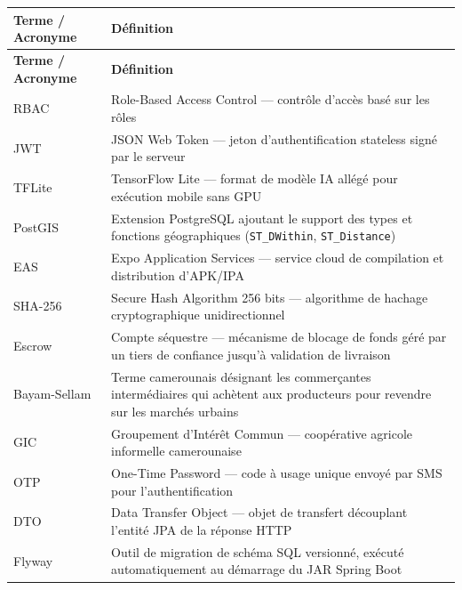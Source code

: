 \documentclass[12pt,a4paper]{report}
\begin{document}
\begin{longtable}{L{3cm} X}
\toprule
\textbf{Terme / Acronyme} & \textbf{Définition} \\
\midrule
\endfirsthead
\toprule
\textbf{Terme / Acronyme} & \textbf{Définition} \\
\midrule
\endhead
\bottomrule
\endfoot
RBAC & Role-Based Access Control — contrôle d'accès basé sur les rôles \\
JWT & JSON Web Token — jeton d'authentification stateless signé par le serveur \\
TFLite & TensorFlow Lite — format de modèle IA allégé pour exécution mobile sans GPU \\
PostGIS & Extension PostgreSQL ajoutant le support des types et fonctions géographiques (\texttt{ST\_DWithin}, \texttt{ST\_Distance}) \\
EAS & Expo Application Services — service cloud de compilation et distribution d'APK/IPA \\
SHA-256 & Secure Hash Algorithm 256 bits — algorithme de hachage cryptographique unidirectionnel \\
Escrow & Compte séquestre — mécanisme de blocage de fonds géré par un tiers de confiance jusqu'à validation de livraison \\
Bayam-Sellam & Terme camerounais désignant les commerçantes intermédiaires qui achètent aux producteurs pour revendre sur les marchés urbains \\
GIC & Groupement d'Intérêt Commun — coopérative agricole informelle camerounaise \\
OTP & One-Time Password — code à usage unique envoyé par SMS pour l'authentification \\
DTO & Data Transfer Object — objet de transfert découplant l'entité JPA de la réponse HTTP \\
Flyway & Outil de migration de schéma SQL versionné, exécuté automatiquement au démarrage du JAR Spring Boot \\
\end{longtable}
\end{document}
